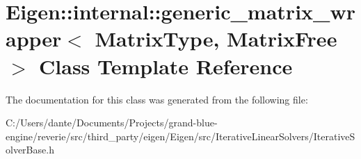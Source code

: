 \hypertarget{class_eigen_1_1internal_1_1generic__matrix__wrapper}{}\section{Eigen\+::internal\+::generic\+\_\+matrix\+\_\+wrapper$<$ Matrix\+Type, Matrix\+Free $>$ Class Template Reference}
\label{class_eigen_1_1internal_1_1generic__matrix__wrapper}


The documentation for this class was generated from the following file\+:\begin{DoxyCompactItemize}
\item 
C\+:/\+Users/dante/\+Documents/\+Projects/grand-\/blue-\/engine/reverie/src/third\+\_\+party/eigen/\+Eigen/src/\+Iterative\+Linear\+Solvers/Iterative\+Solver\+Base.\+h\end{DoxyCompactItemize}
